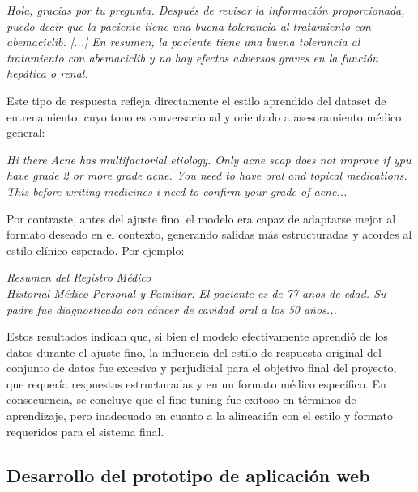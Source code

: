 \documentclass[../main.tex]{subfiles}
\begin{document}
\begin{tcolorbox}[quoterect]
	\textit{Hola, gracias por tu pregunta. Después de revisar la información proporcionada, puedo decir que la paciente tiene una buena tolerancia al tratamiento con abemaciclib. [...] En resumen, la paciente tiene una buena tolerancia al tratamiento con abemaciclib y no hay efectos adversos graves en la función hepática o renal.}
\end{tcolorbox}

Este tipo de respuesta refleja directamente el estilo aprendido del dataset de entrenamiento, cuyo tono es conversacional y orientado a asesoramiento médico general:

\begin{tcolorbox}[quoterect]
	\textit{Hi there Acne has multifactorial etiology. Only acne soap does not improve if ypu have grade 2 or more grade acne. You need to have oral and topical medications. This before writing medicines i need to confirm your grade of acne...}
\end{tcolorbox}

Por contraste, antes del ajuste fino, el modelo era capaz de adaptarse mejor al formato deseado en el contexto, generando salidas más estructuradas y acordes al estilo clínico esperado. Por ejemplo:

\begin{tcolorbox}[quoterect]
	\textit{Resumen del Registro Médico} \\
	\textit{Historial Médico Personal y Familiar: El paciente es de 77 años de edad. Su padre fue diagnosticado con cáncer de cavidad oral a los 50 años...}
	


\end{tcolorbox}

Estos resultados indican que, si bien el modelo efectivamente aprendió de los datos durante el ajuste fino, la influencia del estilo de respuesta original del conjunto de datos fue excesiva y perjudicial para el objetivo final del proyecto, que requería respuestas estructuradas y en un formato médico específico. En consecuencia, se concluye que el fine-tuning fue exitoso en términos de aprendizaje, pero inadecuado en cuanto a la alineación con el estilo y formato requeridos para el sistema final.


\subsection{Desarrollo del prototipo de aplicación web}
\end{document}
